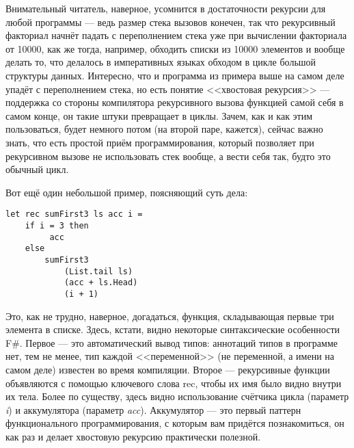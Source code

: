\documentclass[a5paper]{article}
\begin{document}
Внимательный читатель, наверное, усомнится в достаточности рекурсии для любой программы --- ведь размер стека вызовов конечен, так что рекурсивный факториал начнёт падать с переполнением стека уже при вычислении факториала от 10000, как же тогда, например, обходить списки из 10000 элементов и вообще делать то, что делалось в императивных языках обходом в цикле большой структуры данных. Интересно, что и программа из примера выше на самом деле упадёт с переполнением стека, но есть понятие <<хвостовая рекурсия>> --- поддержка со стороны компилятора рекурсивного вызова функцией самой себя в самом конце, он такие штуки превращает в циклы. Зачем, как и как этим пользоваться, будет немного потом (на второй паре, кажется), сейчас важно знать, что есть простой приём программирования, который позволяет при рекурсивном вызове не использовать стек вообще, а вести себя так, будто это обычный цикл.

Вот ещё один небольшой пример, поясняющий суть дела:
\begin{verbatim}
let rec sumFirst3 ls acc i =
    if i = 3 then 
         acc 
    else 
        sumFirst3 
            (List.tail ls) 
            (acc + ls.Head) 
            (i + 1)
\end{verbatim}

Это, как не трудно, наверное, догадаться, функция, складывающая первые три элемента в списке. Здесь, кстати, видно некоторые синтаксические особенности F\#. Первое --- это автоматический вывод типов: аннотаций типов в программе нет, тем не менее, тип каждой <<переменной>> (не переменной, а имени на самом деле) известен во время компиляции. Второе --- рекурсивные функции объявляются с помощью ключевого слова rec, чтобы их имя было видно внутри их тела. Более по существу, здесь видно использование счётчика цикла (параметр \textit{i}) и аккумулятора (параметр \textit{acc}). Аккумулятор --- это первый паттерн функционального программирования, с которым вам придётся познакомиться, он как раз и делает хвостовую рекурсию практически полезной. 
\end{document}
